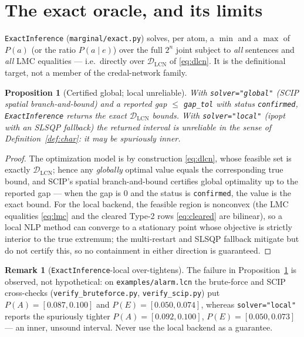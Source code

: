 \documentclass[11pt]{article}
\newtheorem{proposition}{Proposition}
\theoremstyle{definition}
\newtheorem{remark}{Remark}
\newcommand{\DLCN}{\mathcal{D}_{\mathrm{LCN}}}
\begin{document}
\section{The exact oracle, and its limits}\label{sec:exact}

\texttt{ExactInference} (\texttt{marginal/exact.py}) solves, per atom, a $\min$ and a $\max$ of $P(a)$
(or the ratio $P(a\mid e)$) over the full $2^n$ joint subject to \emph{all} sentences and \emph{all}
LMC equalities --- i.e.\ directly over $\DLCN$ of \eqref{eq:dlcn}. It is the definitional target, not a
member of the credal-network family.

\begin{proposition}[Certified global; local unreliable]\label{prop:exactinf}
With \texttt{solver="global"} (SCIP spatial branch-and-bound) and a reported gap $\le$
\texttt{gap\_tol} with status \texttt{confirmed}, \texttt{ExactInference} returns the exact $\DLCN$
bounds. With \texttt{solver="local"} (ipopt with an SLSQP fallback) the returned interval is
\emph{unreliable} in the sense of Definition~\ref{def:char}: it may be spuriously inner.
\end{proposition}

\begin{proof}
The optimization model is by construction \eqref{eq:dlcn}, whose feasible set is exactly $\DLCN$;
hence any \emph{globally} optimal value equals the corresponding true bound, and SCIP's spatial
branch-and-bound certifies global optimality up to the reported gap --- when the gap is $0$ and the
status is \texttt{confirmed}, the value is the exact bound. For the local backend, the feasible region
is nonconvex (the LMC equalities \eqref{eq:lmc} and the cleared Type-2 rows \eqref{eq:cleared} are
bilinear), so a local NLP method can converge to a stationary point whose objective is strictly
interior to the true extremum; the multi-restart and SLSQP fallback mitigate but do not certify this,
so no containment in either direction is guaranteed.
\end{proof}

\begin{remark}[\texttt{ExactInference}-local over-tightens]\label{rem:exactlocal}
The failure in Proposition~\ref{prop:exactinf} is observed, not hypothetical: on
\texttt{examples/alarm.lcn} the brute-force and SCIP cross-checks
(\texttt{verify\_bruteforce.py}, \texttt{verify\_scip.py}) put $P(A)=[0.087,0.100]$ and
$P(E)=[0.050,0.074]$, whereas \texttt{solver="local"} reports the spuriously tighter
$P(A)=[0.092,0.100]$, $P(E)=[0.050,0.073]$ --- an inner, unsound interval. Never use the local backend
as a guarantee.
\end{remark}
\end{document}

